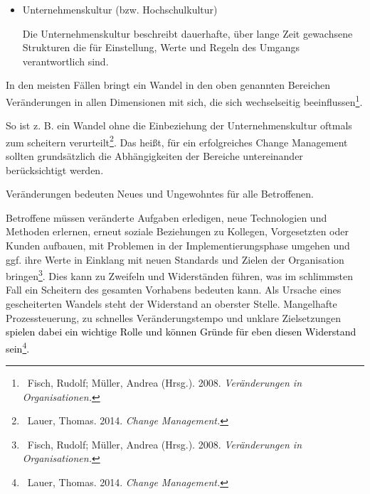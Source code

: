 \documentclass[a4paper]{article}
\newcommand\liststyleLi{%
\renewcommand\labelitemi{•}
\renewcommand\labelitemii{◦}
\renewcommand\labelitemiii{${\blacksquare}$}
\renewcommand\labelitemiv{•}
}
\begin{document}
\bigskip

\liststyleLi
\begin{itemize}
\item {\sffamily
Unternehmenskultur (bzw. Hochschulkultur) }

{\sffamily
Die Unternehmenskultur beschreibt dauerhafte, über lange Zeit gewachsene Strukturen die für Einstellung, Werte und
Regeln des Umgangs verantwortlich sind. }


\bigskip
\end{itemize}
{\sffamily
In den meisten Fällen bringt ein Wandel in den oben genannten Bereichen Veränderungen in allen Dimensionen mit sich, die
sich wechselseitig beeinflussen\footnote{\textcolor[rgb]{0.12941177,0.11764706,0.11764706}{\ Fisch, Rudolf; Müller,
Andrea (Hrsg.). 2008. }\textit{\textcolor[rgb]{0.12941177,0.11764706,0.11764706}{Veränderungen in Organisationen.}}}. }

{\sffamily
So ist z. B. ein Wandel ohne die Einbeziehung der Unternehmenskultur oftmals zum scheitern
verurteilt\footnote{\textsf{\ Lauer, Thomas. 2014.
}\textsf{\textit{\textcolor[rgb]{0.06666667,0.06666667,0.06666667}{Change Management.}}}}. Das heißt, für ein
erfolgreiches Change Management sollten grundsätzlich die Abhängigkeiten der Bereiche untereinander berücksichtigt
werden.}


\bigskip

{\sffamily
Veränderungen bedeuten Neues und Ungewohntes für alle Betroffenen. }

{\sffamily
Betroffene müssen veränderte Aufgaben erledigen, neue Technologien und Methoden erlernen, erneut soziale Beziehungen zu
Kollegen, Vorgesetzten oder Kunden aufbauen, mit Problemen in der Implementierungsphase umgehen und ggf. ihre Werte in
Einklang mit neuen Standards und Zielen der Organisation
bringen\footnote{\textcolor[rgb]{0.12941177,0.11764706,0.11764706}{\ Fisch, Rudolf; Müller, Andrea (Hrsg.). 2008.
}\textit{\textcolor[rgb]{0.12941177,0.11764706,0.11764706}{Veränderungen in Organisationen.}}}. Dies kann zu Zweifeln
und Widerständen führen, was im schlimmsten Fall ein Scheitern des gesamten Vorhabens bedeuten kann. Als Ursache eines
gescheiterten Wandels steht der Widerstand an oberster Stelle. Mangelhafte Prozessteuerung, zu schnelles
Veränderungstempo und unklare Zielsetzungen \textcolor{black}{spielen dabei ein wichtige Rolle und können Gründe für
eben diesen Widerstand sein}\footnote{\textsf{\ Lauer, Thomas. 2014.
}\textsf{\textit{\textcolor[rgb]{0.06666667,0.06666667,0.06666667}{Change Management.}}}}\textcolor{black}{. }}
\end{document}
